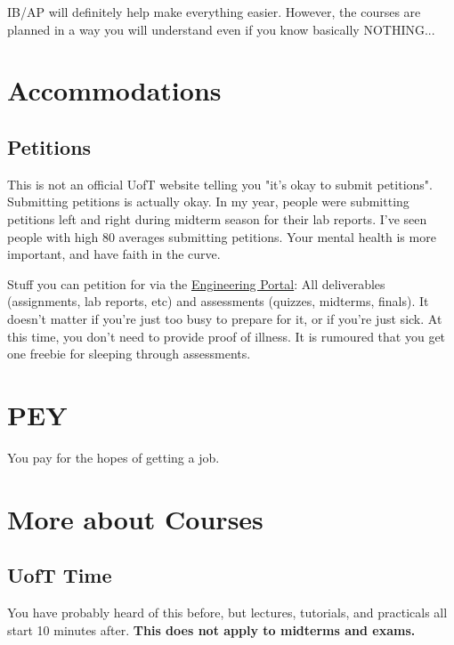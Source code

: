 IB/AP will definitely help make everything easier. However, the courses are planned in a way you will understand even if you know basically NOTHING...

\section{Accommodations}

\subsection{Petitions}

This is not an official UofT website telling you "it's okay to submit petitions". Submitting petitions is actually okay. In my year, people were submitting petitions left and right during midterm season for their lab reports. I've seen people with high 80 averages submitting petitions. Your mental health is more important, and have faith in the curve.

Stuff you can petition for via the \href{https://www.google.com/url?sa=t&rct=j&q=&esrc=s&source=web&cd=&cad=rja&uact=8&ved=2ahUKEwjZj-qeh-7-AhX-kokEHX8-C8YQFnoECA0QAQ&url=http\%3A\%2F\%2Fundergrad.engineering.utoronto.ca\%2Fskule-\%2520\%2520\%2520\%2520\%2520\%2520\%2520\%2520\%2520\%2520\%2520\%2520life\%2Fthe-engineering-portal\%2F&usg=AOvVaw145xL8tAHUKBRq6D6rbDhS}{Engineering Portal}: All deliverables (assignments, lab reports, etc) and assessments (quizzes, midterms, finals). It doesn't matter if you're just too busy to prepare for it, or if you're just sick. At this time, you don't need to provide proof of illness. It is rumoured that you get one freebie for sleeping through assessments.

\section{PEY}

You pay for the hopes of getting a job.

\section{More about Courses}

\subsection{UofT Time}

You have probably heard of this before, but lectures, tutorials, and practicals all start 10 minutes after. \textbf{This does not apply to midterms and exams.}


